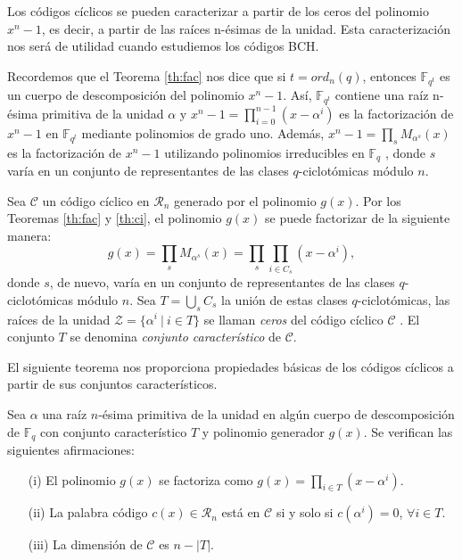 Los códigos cíclicos se pueden caracterizar a partir de los ceros del polinomio $x^n - 1$, es decir, a partir de las raíces n-ésimas de la unidad. Esta caracterización nos será de utilidad cuando estudiemos los códigos BCH.

Recordemos que el Teorema \ref{th:fac} nos dice que si $t = ord_n(q)$, entonces $\mathbb{F}_{q^t}$ es un cuerpo de descomposición del polinomio $x^n - 1$. Así, $\mathbb{F}_{q^t}$ contiene una raíz n-ésima primitiva de la unidad $\alpha$ y $x^n - 1 = \prod_{i=0}^{n-1}(x-\alpha^i)$ es la factorización de $x^n - 1$ en $\mathbb{F}_{q^t}$ mediante polinomios de grado uno. Además, $x^n - 1 = \prod_{s}M_{\alpha^s}(x)$ es la factorización de $x^n - 1$ utilizando polinomios irreducibles en $\mathbb{F}_q$ , donde $s$ varía en un conjunto de representantes de las clases $q$-ciclotómicas módulo $n$.

Sea $\mathcal{C}$ un código cíclico en $\mathcal{R}_n$ generado por el polinomio $g(x)$. Por los Teoremas \ref{th:fac} y \ref{th:ci}, el polinomio $g(x)$ se puede factorizar de la siguiente manera: \begin{equation}\label{eq:fac} g(x) = \prod_{s}M_{\alpha^s}(x) = \prod_{s}\prod_{i \in C_s}(x-\alpha^i),\end{equation} donde $s$, de nuevo, varía en un conjunto de representantes de las clases $q$-ciclotómicas módulo $n$. Sea $T = \bigcup_{s}C_s$ la unión de estas clases $q$-ciclotómicas, las raíces de la unidad $\mathcal{Z} = \{\alpha^i \ | \ i \in T \}$ se llaman \emph{ceros} del código cíclico $\mathcal{C}$ . El conjunto $T$ se denomina \emph{conjunto característico} de $\mathcal{C}$.

El siguiente teorema nos proporciona propiedades básicas de los códigos cíclicos a partir de sus conjuntos característicos.

\begin{teorema}\label{th:cc}
  Sea $\alpha$ una raíz $n$-ésima primitiva de la unidad en algún cuerpo de descomposición de $\mathbb{F}_q$ con conjunto característico $T$ y polinomio generador $g(x)$. Se verifican las siguientes afirmaciones:
  \begin{itemize}
    \item[(i)] El polinomio $g(x)$ se factoriza como $g(x) = \prod_{i \in T}(x - \alpha^i)$.
    \item[(ii)] La palabra código $c(x) \in \mathcal{R}_n$ está en $\mathcal{C}$ si y solo si $c(\alpha^i) = 0$, $\forall i \in T$.
    \item[(iii)]  La dimensión de $\mathcal{C}$ es $n - |T|$.
    \end{itemize}
\end{teorema}

